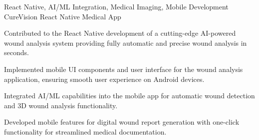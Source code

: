 \begin{cventries}
  \cventry
    {React Native, AI/ML Integration, Medical Imaging, Mobile Development} %
    {CureVision} %
    {React Native Medical App} %
    {} %
    {
      \begin{cvitems} %
        \item {Contributed to the React Native development of a cutting-edge AI-powered wound analysis system providing fully automatic and precise wound analysis in seconds.}
        \item {Implemented mobile UI components and user interface for the wound analysis application, ensuring smooth user experience on Android devices.}
        \item {Integrated AI/ML capabilities into the mobile app for automatic wound detection and 3D wound analysis functionality.}
        \item {Developed mobile features for digital wound report generation with one-click functionality for streamlined medical documentation.}
      \end{cvitems}
    }

\end{cventries} 